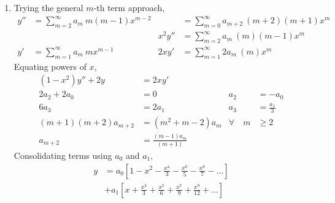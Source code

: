 \begin{enumerate}
    \item Trying the general $ m $-th term approach,
          \begin{align}
              y''    & = \sum_{m=2}^{\infty}a_m\ m(m-1)x^{m-2}     &
                     & = \sum_{m=0}^{\infty}a_{m+2}\ (m+2)(m+1)x^m   \\
                     &                                             &
              x^2y'' & = \sum_{m=2}^{\infty}a_{m}\ (m)(m-1)x^m       \\
              y'     & = \sum_{m=1}^{\infty}a_m\ mx^{m-1}          &
              2xy'   & = \sum_{m = 1}^{\infty}2a_{m}\ (m)x^m
          \end{align}
          Equating powers of $ x $,
          \begin{align}
              (1-x^2)y'' + 2y   & = 2xy'                     \\
              2a_2 + 2a_0       & = 0                      &
              a_2               & = -a_0                     \\
              6a_3              & = 2a_1                   &
              a_3               & = \frac{a_1}{3}            \\
              (m+1)(m+2)a_{m+2} & = (m^2 + m - 2)a_m       &
              \forall \quad m   & \geq 2                     \\
              a_{m+2}           & = \frac{(m-1)a_m}{(m+1)}
          \end{align}
          Consolidating terms using $ a_0 $ and $a_1$,
          \begin{align}
              y & = a_0 \left[1 - x^2 - \frac{x^4}{3} - \frac{x^6}{5}
              - \frac{x^8}{7} - \dots \right]                         \\
                & + a_1 \left[ x + \frac{x^3}{3} + \frac{x^5}{6}
                  + \frac{x^7}{9} + \frac{x^9}{12} + \dots \right]
          \end{align}


\end{enumerate}
